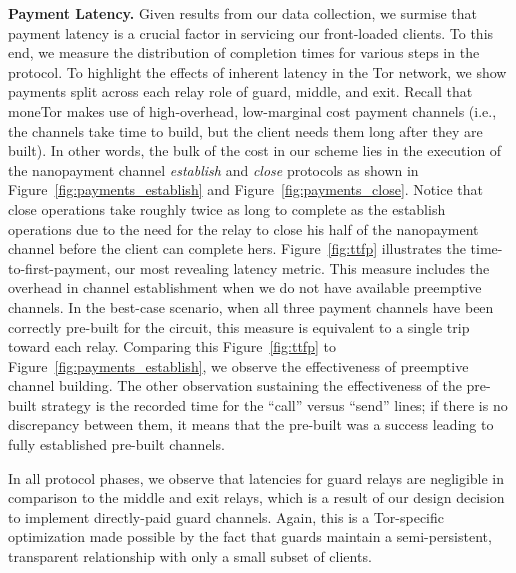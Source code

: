 \medskip \noindent \textbf{Payment Latency.}
Given results from our data collection, we surmise that payment latency is a crucial factor in servicing our front-loaded clients.
To this end, we measure the distribution of completion times for various steps in the protocol.
To highlight the effects of inherent latency in the Tor network, we show payments split across each relay role of guard, middle, and exit.
Recall that moneTor makes use of high-overhead, low-marginal cost payment channels (i.e., the channels take time to build, but the client needs them long after they are built).
In other words, the bulk of the cost in our scheme lies in the execution of the nanopayment channel \emph{establish} and \emph{close} protocols as shown in Figure~\ref{fig:payments_establish} and Figure~\ref{fig:payments_close}.
Notice that close operations take roughly twice as long to complete as the establish operations due to the need for the relay to close his half of the nanopayment channel before the client can complete hers.
Figure~\ref{fig:ttfp} illustrates the time-to-first-payment, our most revealing latency metric.
This measure includes the overhead in channel establishment when we do not have available preemptive channels.
In the best-case scenario, when all three payment channels have been correctly pre-built for the circuit, this measure is equivalent to a single trip toward each relay.
Comparing this Figure~\ref{fig:ttfp} to Figure~\ref{fig:payments_establish}, we observe the effectiveness of preemptive channel building.
The other observation sustaining the effectiveness of the pre-built strategy is the recorded time for the ``call'' versus ``send'' lines; if there is no discrepancy between them, it means that the pre-built was a success leading to fully established pre-built channels.

In all protocol phases, we observe that latencies for guard relays are negligible in comparison to the middle and exit relays, which is a result of our design decision to implement directly-paid guard channels.
Again, this is a Tor-specific optimization made possible by the fact that guards maintain a semi-persistent, transparent relationship with only a small subset of clients.

